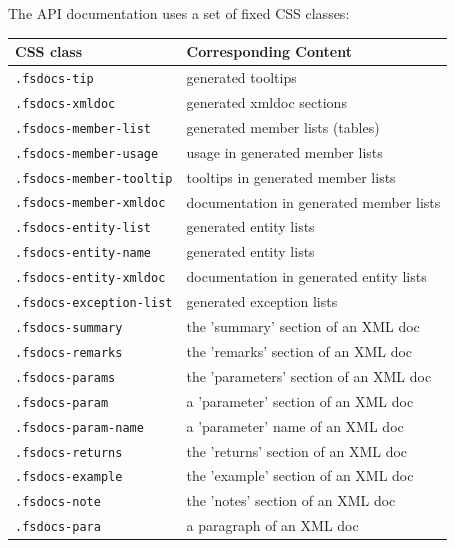 \documentclass{article}
\begin{document}
The API documentation uses a set of fixed CSS classes:
\begin{tabular}{|l|l|}\hline
\textbf{CSS class} & \textbf{Corresponding Content}\\ \hline\hline
\texttt{.fsdocs-tip} & generated tooltips\\ \hline
\texttt{.fsdocs-xmldoc} & generated xmldoc sections\\ \hline
\texttt{.fsdocs-member-list} & generated member lists (tables)\\ \hline
\texttt{.fsdocs-member-usage} & usage in generated member lists\\ \hline
\texttt{.fsdocs-member-tooltip} & tooltips in generated member lists\\ \hline
\texttt{.fsdocs-member-xmldoc} & documentation in generated member lists\\ \hline
\texttt{.fsdocs-entity-list} & generated entity lists\\ \hline
\texttt{.fsdocs-entity-name} & generated entity lists\\ \hline
\texttt{.fsdocs-entity-xmldoc} & documentation in generated entity lists\\ \hline
\texttt{.fsdocs-exception-list} & generated exception lists\\ \hline
\texttt{.fsdocs-summary} & the 'summary' section of an XML doc\\ \hline
\texttt{.fsdocs-remarks} & the 'remarks' section of an XML doc\\ \hline
\texttt{.fsdocs-params} & the 'parameters' section of an XML doc\\ \hline
\texttt{.fsdocs-param} & a 'parameter' section of an XML doc\\ \hline
\texttt{.fsdocs-param-name} & a 'parameter' name of an XML doc\\ \hline
\texttt{.fsdocs-returns} & the 'returns' section of an XML doc\\ \hline
\texttt{.fsdocs-example} & the 'example' section of an XML doc\\ \hline
\texttt{.fsdocs-note} & the 'notes' section of an XML doc\\ \hline
\texttt{.fsdocs-para} & a paragraph of an XML doc\\ \hline
\end{tabular}
\end{document}
